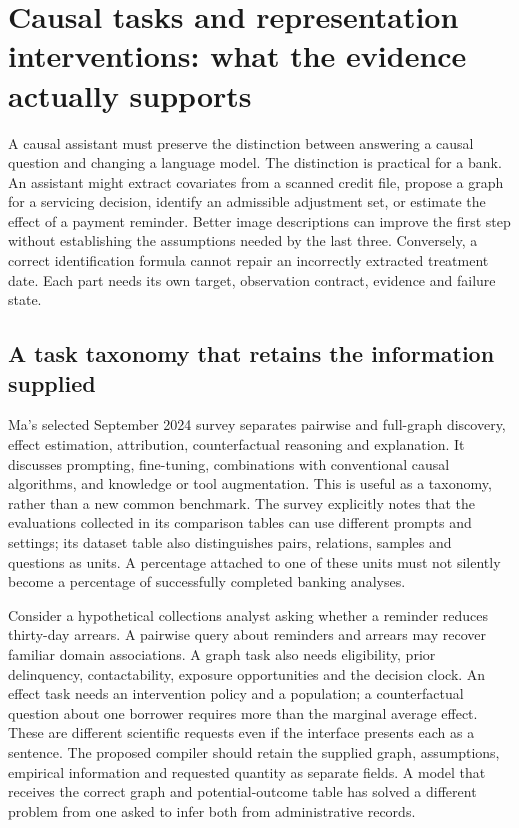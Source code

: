 \section[Causal tasks and representation interventions]{Causal tasks and representation interventions: what the evidence actually supports}
\label{sec:exec28-fr}
A causal assistant must preserve the distinction between answering a causal question and changing a language model.
The distinction is practical for a bank. An assistant might extract covariates from a scanned credit file,
propose a graph for a servicing decision, identify an admissible adjustment set, or estimate the effect of a payment reminder.
Better image descriptions can improve the first step without establishing the assumptions needed by the last three.
Conversely, a correct identification formula cannot repair an incorrectly extracted treatment date. Each part needs its own
target, observation contract, evidence and failure state.

\subsection{A task taxonomy that retains the information supplied}
Ma's selected September 2024 survey separates pairwise and full-graph discovery, effect estimation,
attribution, counterfactual reasoning and explanation. It discusses prompting, fine-tuning, combinations with conventional
causal algorithms, and knowledge or tool augmentation. This is useful as a taxonomy, rather than a new common benchmark.
The survey explicitly notes that the evaluations collected in its comparison tables can use different prompts and settings;
its dataset table also distinguishes pairs, relations, samples and questions as units. A percentage attached to one of these
units must not silently become a percentage of successfully completed banking analyses.\citep{exec28_fr_ma}

Consider a hypothetical collections analyst asking whether a reminder reduces thirty-day arrears. A pairwise query about
reminders and arrears may recover familiar domain associations. A graph task also needs eligibility, prior delinquency,
contactability, exposure opportunities and the decision clock. An effect task needs an intervention policy and a population;
a counterfactual question about one borrower requires more than the marginal average effect. These are different scientific
requests even if the interface presents each as a sentence. The proposed compiler should retain the supplied graph,
assumptions, empirical information and requested quantity as separate fields. A model that receives the correct graph and
potential-outcome table has solved a different problem from one asked to infer both from administrative records.


